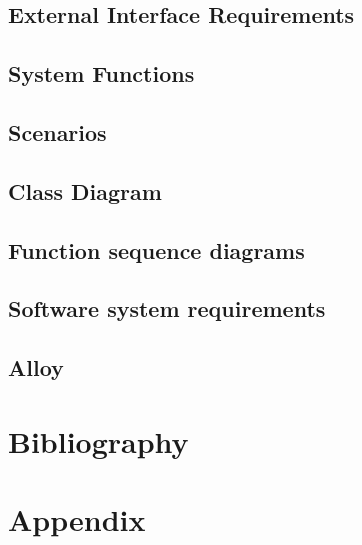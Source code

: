 \documentclass[12pt, a4paper]{article}
\begin{document}
    	\subsection{External Interface Requirements}
    	
    	
    	\subsection{System Functions}
    	
    	
    	\subsection{Scenarios}
    	
    	
    	\newpage
    	\subsection{Class Diagram}
    	
    	
    	\newpage
    	\subsection{Function sequence diagrams}
    	
    	
    	\subsection{Software system requirements}
    	
    	
    	\subsection{Alloy}
    	
    
    \newpage
    \section{Bibliography}
        
    
    \newpage
    \section*{Appendix}
        
    
\end{document}
